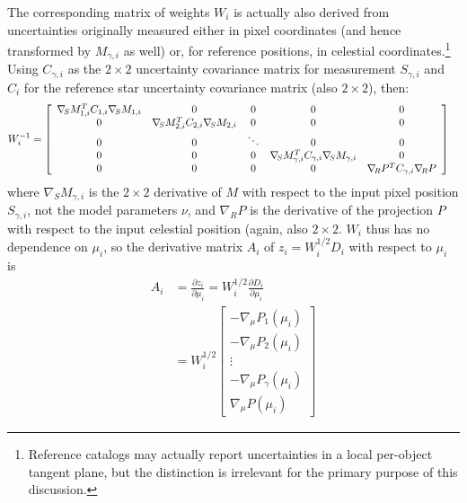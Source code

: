 The corresponding matrix of weights $W_i$ is actually also derived from uncertainties originally measured either in pixel coordinates (and hence transformed by $M_{\gamma,i}$ as well) or, for reference positions, in celestial coordinates.\footnote{Reference catalogs may actually report uncertainties in a local per-object tangent plane, but the distinction is irrelevant for the primary purpose of this discussion.}
Using $C_{\gamma,i}$ as the $2\times 2$ uncertainty covariance matrix for measurement $S_{\gamma,i}$ and $C_{i}$ for the reference star uncertainty covariance matrix (also $2\times 2$), then:
\begin{align}
    W_i^{-1} &= \left[
        \begin{array}{ c c c c c }
            \nabla\!_S M_{1, i}^T C_{1,i} \nabla\!_S M_{1, i} & 0 & 0 & 0 & 0 \\
            0 & \nabla\!_S M_{2, i}^T C_{2,i} \nabla\!_S M_{2, i} & 0 & 0 & 0 \\
            0 & 0 & \ddots & 0 & 0 \\
            0 & 0 & 0 & \nabla\!_S M_{\gamma, i}^T C_{\gamma,i} \nabla\!_S M_{\gamma, i} & 0 \\
            0 & 0 & 0 & 0 & \nabla\!_R P^T C_{\gamma,i} \nabla\!_R P
        \end{array}
    \right]
\end{align}
where $\nabla\!_S M_{\gamma,i}$ is the $2\times 2$ derivative of $M$ with respect to the input pixel position $S_{\gamma,i}$, not the model parameters $\nu$, and $\nabla\!_R P$ is the derivative of the projection $P$ with respect to the input celestial position (again, also $2\times 2$.
$W_i$ thus has no dependence on $\mu_i$, so the derivative matrix $A_i$ of $z_i = W_i^{1/2} D_i$ with respect to $\mu_i$ is
\begin{align}
    A_i &= \frac{\partial z_i}{\partial \mu_i} = W_i^{1/2}\frac{\partial D_i}{\partial \mu_i} \\
        &= W_i^{1/2}\left[
            \begin{array}{ c }
                - \nabla\!_{\mu} P_1\left(\mu_i\right) \\
                - \nabla\!_{\mu} P_2\left(\mu_i\right) \\
                \vdots \\
                - \nabla\!_{\mu} P_{\gamma}\left(\mu_i\right) \\
                \nabla\!_{\mu} P\left(\mu_i\right)
            \end{array}
        \right]
\end{align}

